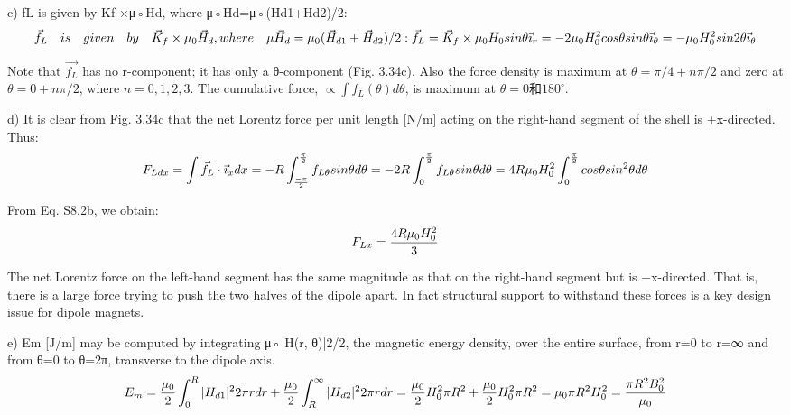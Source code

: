 c) fL is given by Kf ×μ◦Hd, where μ◦Hd=μ◦(Hd1+Hd2)/2:
$$
\vec{f}_{L}\quad is\quad given\quad by\quad\vec{K}_{f}\times\mu_{0}\vec{H}_{d},where\quad\mu \vec{H}_{d}=\mu_{0}(\vec{H}_{d1}+\vec{H}_{d2})/2:\\
\vec{f}_{L}=\vec{K}_{f}\times\mu_{0}H_{0}sin\theta\vec{\imath}_{r}\\%
=-2\mu_{0}H_{0}^{2}cos\theta sin\theta\vec{\imath}_{\theta}\\
=-\mu_{0}H_{0}^{2}sin2\theta\vec{\imath}_{\theta}\\%
$$

Note that $\vec{f_L}$ has no r-component; it has only a θ-component (Fig. 3.34c). Also
the force density is maximum at $\theta=\pi/4+n\pi/2$ and zero at$\theta=0+n\pi/2$, where
$n=0, 1, 2, 3$. The cumulative force, $\propto\int f_L(\theta)d\theta$, is maximum at $\theta=0$和$180^\circ$.

d) It is clear from Fig. 3.34c that the net Lorentz force per unit length [N/m]
acting on the right-hand segment of the shell is +x-directed. Thus:
$$
F_{Ldx}=\int\vec{f}_{L}\cdot\vec{\imath}_{x}dx=-R\int_{\frac{-\pi}{2}}^{\frac{\pi}{2}}f_{L\theta}sin\theta d\theta\\%
=-2R\int_{0}^{\frac{\pi}{2}}f_{L\theta}sin\theta d\theta=4R\mu_{0}H_{0}^{2}\int_{0}^{\frac{\pi}{2}}cos\theta sin^{2}\theta d\theta\\%
$$

From Eq. S8.2b, we obtain:
$$
F_{Lx}=\frac{4R\mu_{0}H_{0}^{2}}{3}\\%
$$

The net Lorentz force on the left-hand segment has the same magnitude as that
on the right-hand segment but is −x-directed. That is, there is a large force trying
to push the two halves of the dipole apart. In fact structural support to withstand
these forces is a key design issue for dipole magnets.

e) Em [J/m] may be computed by integrating μ◦|H(r, θ)|2/2, the magnetic energy density, over the entire surface, from r=0 to r=∞ and from θ=0 to θ=2π,
transverse to the dipole axis.
$$
E_{m}=\frac{\mu_{0}}{2}\int_{0}^{R}|H_{d1}|^{2}2\pi rdr+\frac{\mu_{0}}{2}\int_{R}^{\infty}|H_{d2}|^{2}2\pi rdr\\%
=\frac{\mu_{0}}{2}H_{0}^{2}\pi R^{2}+\frac{\mu_{0}}{2}H_{0}^{2}\pi R^{2}\\%
=\mu_{0}\pi R^{2}H_{0}^{2}=\frac{\pi R^{2}B_{0}^{2}}{\mu_{0}}\\%
$$

